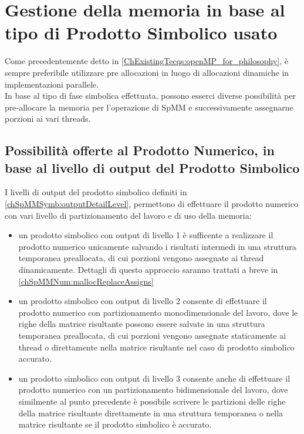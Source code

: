 \section{Gestione della memoria in base al tipo di Prodotto Simbolico usato}
Come precedentemente detto in \ref{ChExistingTecqs:openMP_for_philosophy},
è sempre preferibile utilizzare pre allocazioni in luogo di allocazioni dinamiche 
in implementazioni parallele.\\
In base al tipo di fase simbolica effettuata, possono esserci diverse possibilità per 
pre-allocare la memoria per l'operazione di SpMM e successivamente assegnarne 
porzioni ai vari threads.\\
\subsection{Possibilità offerte al Prodotto Numerico, in base al livello di output del Prodotto Simbolico}
\label{chSpMMNum:funcsMultiImplePurpose}
I livelli di output del prodotto simbolico definiti in \ref{chSpMMSymb:outputDetailLevel}, 
permettono di effettuare il prodotto numerico con vari livello di 
partizionamento del lavoro e di uso della memoria:
\begin{itemize}
	\item un prodotto simbolico con output di livello 1 è sufficente a realizzare 
		  il prodotto numerico unicamente salvando i risultati intermedi in una struttura temporanea preallocata,
		  di cui porzioni vengono assegnate ai thread dinamicamente.
		  Dettagli di questo approccio saranno trattati a breve in \ref{chSpMMNum:mallocReplaceAssigns}
	\item un prodotto simbolico con output di livello 2 consente di effettuare il prodotto numerico
		  con partizionamento monodimensionale del lavoro, dove le righe della matrice risultante 
		  possono essere salvate in una struttura temporanea preallocata, di cui porzioni vengono assegnate 
		  staticamente ai thread o direttamente nella matrice risultante nel caso di prodotto simbolico accurato.
	\item un prodotto simbolico con output di livello 3 consente anche di effettuare il prodotto numerico
		  con un partizionamento bidimensionale del lavoro, dove similmente al punto precedente è possibile
		  scrivere le partizioni delle righe della matrice risultante direttamente 
		  in una struttura temporanea o nella matrice risultante se il prodotto simbolico è accurato.
\end{itemize}

